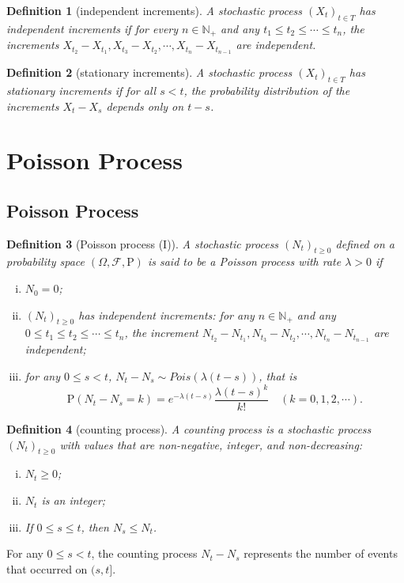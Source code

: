 \documentclass{article}
\newtheorem{definition}{Definition}[section]
\theoremstyle{nonumberplain}
\begin{document}
\begin{definition}[independent increments]
	A stochastic process $(X_t)_{t\in T}$ has \emph{independent increments} if for every $n\in \mathbb{N}_+$ and any $t_1\le t_2 \le\cdots\le t_n$, the increments $X_{t_2}-X_{t_1},X_{t_3}-X_{t_2},\cdots,X_{t_n}-X_{t_{n-1}}$ are independent.
\end{definition}

\begin{definition}[stationary increments]
	A stochastic process $(X_t)_{t\in T}$ has \emph{stationary increments} if for all $s<t$, the probability distribution of the increments $X_{t}-X_{s}$ depends only on $t-s$.
\end{definition}

\section{Poisson Process}
\subsection{Poisson Process}
\begin{definition}[Poisson process (I)]
	A stochastic process $(N_t)_{t\ge0}$ defined on a probability space $(\Omega,\mathcal{F},\mathrm{P})$ is said to be a \emph{Poisson process} with rate $\lambda>0$ if
	\begin{enumerate}[(i)]
		\item $N_0=0$;
		\item \hypertarget{Definition 2.1(ii)}{} $(N_t)_{t\ge0}$ has independent increments: for any $n\in \mathbb{N}_+$ and any $0\le t_1\le t_2 \le\cdots\le t_n$, the increment $N_{t_2}-N_{t_1},N_{t_3}-N_{t_2},\cdots,N_{t_n}-N_{t_{n-1}}$ are independent;
		\item \hypertarget{Definition 2.1(iii)}{}for any $0\le s < t$, $N_t-N_s\sim Pois(\lambda(t-s))$, that is 
		\[
		\mathrm{P}(N_t-N_s=k)=e^{-\lambda(t-s)}\dfrac{\lambda(t-s)^k}{k!}\quad(k=0,1,2,\cdots).
		\]
	\end{enumerate}	
\end{definition}

\begin{definition}[counting process]
	A \emph{counting process} is a stochastic process $(N_t)_{t\ge 0}$ with values that are non-negative, integer, and non-decreasing:
	\begin{enumerate}[(i)]
		\item $N_t\ge0$;
		\item $N_t$ is an integer;
		\item If $0\le s\le t$, then $N_s \le N_t$.
	\end{enumerate}	
		
\end{definition}
For any $0\le s<t$, the counting process $N_t-N_s$ represents the number of events that occurred on $(s,t]$.  
\end{document}

